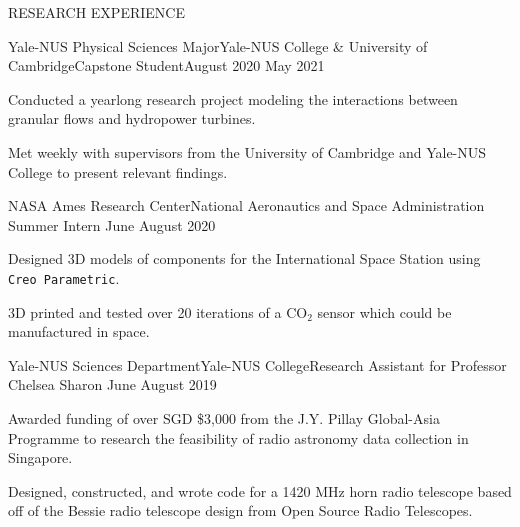 \documentclass{resume} %
\begin{document}
\begin{rSection}{RESEARCH EXPERIENCE}

\begin{rSubsection}{Yale-NUS Physical Sciences Major}{Yale-NUS College \& University of Cambridge}{Capstone Student}{August 2020 {\textendash} May 2021}
\item Conducted a yearlong research project modeling the interactions between granular flows and hydropower turbines. 
\item Met weekly with supervisors from the University of Cambridge and Yale-NUS College to present relevant findings. 

\end{rSubsection}


\begin{rSubsection}{NASA Ames Research Center}{National Aeronautics and Space Administration} {Summer Intern} 
{June  {\textendash} August 2020}
\item  Designed 3D models of components for the International Space Station using \texttt{Creo Parametric}.
\item 3D printed and tested over 20 iterations of a $\text{CO}_2$ sensor which could be manufactured in space.

\end{rSubsection}

\begin{rSubsection}{Yale-NUS Sciences Department}{Yale-NUS College}{Research Assistant for Professor Chelsea Sharon}{  June  {\textendash} August 2019}
\item Awarded funding of over SGD \$3,000 from the J.Y. Pillay Global-Asia Programme to research the feasibility of radio astronomy data collection in Singapore. 

\item Designed, constructed, and wrote code for a 1420 MHz horn radio telescope based off of the Bessie radio telescope design from Open Source Radio Telescopes. 

\end{rSubsection}


\end{rSection}
\end{document}
